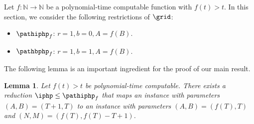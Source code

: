 \documentclass[10pt,a4paper]{article}
\theoremstyle{definition}
\theoremstyle{plain}
\newtheorem{lemma}{Lemma}
\theoremstyle{remark}
\begin{document}
Let $f\colon \mathbb{N} \to \mathbb{N}$ be a polynomial-time computable function with $f(t) > t$. In this section, we consider the following restrictions of $\grid$:

\begin{itemize}
    \item $\pathiphp_f$: $r=1, b=0, A = f(B)$.
    \item $\pathbphp_f$: $r=1, b=1, A = f(B)$.
\end{itemize}

The following lemma is an important ingredient for the proof of our main result.


\begin{lemma}\label{lem:inj-path-php}
Let $f(t)>t$ be polynomial-time computable.
There exists a reduction $\iphp\leq \pathiphp_f$ that maps an instance with parameters $(A,B) = (T+1,T)$ to an instance with parameters $(A,B) = (f(T),T)$ and $(N,M) = (f(T),f(T)-T+1)$.
\end{lemma}
\end{document}
